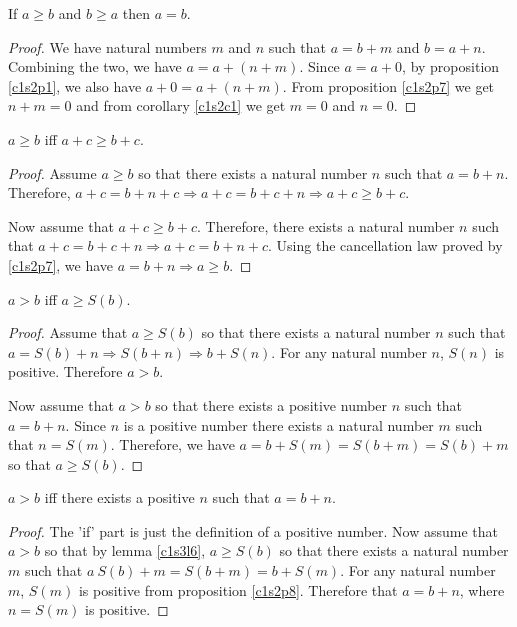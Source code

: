 \begin{lem}\label{c1s3l3}
If $a \ge b$ and $b \ge a$ then $a = b$.
\end{lem}
\begin{proof}
We have natural numbers $m$ and $n$ such that $a = b + m$ and $b = a + n$.
Combining the two, we have $a = a + (n + m)$. Since $a = a + 0$, by
proposition \ref{c1s2p1}, we also have $a + 0 = a + (n + m)$. From 
proposition \ref{c1s2p7} we get $n + m = 0$ and from corollary \ref{c1s2c1}
we get $m = 0$ and $n = 0$.
\end{proof}

\begin{lem}\label{c1s3l4}
$a \ge b$ iff $a + c \ge b + c$.
\end{lem}
\begin{proof}
Assume $a \ge b$ so that there exists a natural number $n$ such that $a = 
b + n$. Therefore, $a + c = b + n + c \Rightarrow a + c = b + c + n
\Rightarrow a + c \ge b + c$.

Now assume that $a + c \ge b + c$. Therefore, there exists a natural number
$n$ such that $a + c = b + c + n \Rightarrow a + c = b + n + c$. Using the
cancellation law proved by \ref{c1s2p7}, we have $a = b + n \Rightarrow
a \ge b$.
\end{proof}

\begin{lem}\label{c1s3l5}
$a > b$ iff $a \ge S(b)$.
\end{lem}
\begin{proof}
Assume that $a \ge S(b)$ so that there exists a natural number $n$ such 
that $a = S(b) + n \Rightarrow S(b + n) \Rightarrow b + S(n)$. For any 
natural number $n$, $S(n)$ is positive. Therefore $a > b$.

Now assume that $a > b$ so that there exists a positive number $n$ such that
$a = b + n$. Since $n$ is a positive number there exists a natural number
$m$ such that $n = S(m)$. Therefore, we have $a = b + S(m) = S(b + m) = 
S(b) + m$ so that $a \ge S(b)$.
\end{proof}

\begin{lem}\label{c1s3l6}
$a > b$ iff there exists a positive $n$ such that $a = b + n$.
\end{lem}
\begin{proof}
The 'if' part is just the definition of a positive number. Now assume that
$a > b$ so that by lemma \ref{c1s3l6}, $a \ge S(b)$ so that there exists 
a natural number $m$ such that $a \ S(b) + m = S(b + m) = b + S(m)$. For 
any natural number $m$, $S(m)$ is positive from proposition \ref{c1s2p8}.
Therefore that $a = b + n$, where $n =S(m)$ is positive.
\end{proof}

